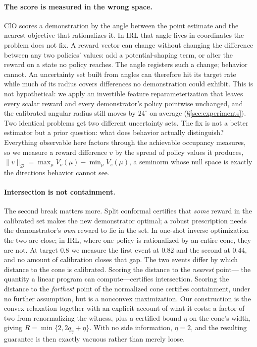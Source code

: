\documentclass{article}
\newcommand{\Dnorm}[1]{\|#1\|_{\mathcal D}}
\begin{document}
\paragraph{The score is measured in the wrong space.} CIO scores a
demonstration by the angle between the point estimate and the nearest objective
that rationalizes it. In IRL that angle lives in coordinates the problem does
not fix. A reward vector can change without changing the difference between any
two policies' values: add a potential-shaping term, or alter the reward on a
state no policy reaches. The angle registers such a change; behavior cannot. An
uncertainty set built from angles can therefore hit its target rate while
much of its radius covers differences no demonstration could exhibit. This is
not hypothetical:
we apply an invertible feature reparameterization that leaves every scalar
reward and every demonstrator's policy pointwise unchanged, and the calibrated
angular radius still moves by $24^\circ$ on average (\S\ref{sec:experiments}).
Two identical problems get two different uncertainty sets. The fix is not a
better estimator but a prior question: what does behavior actually distinguish?
Everything observable here factors through the achievable occupancy measures,
so we measure a reward difference $v$ by the spread of policy values it
produces, $\Dnorm{v}=\max_\mu
V_v(\mu)-\min_\mu V_v(\mu)$, a seminorm whose null space is exactly the
directions behavior cannot see.

\paragraph{Intersection is not containment.} The second break matters more.
Split conformal certifies that \emph{some} reward in the calibrated set makes the new
demonstrator optimal; a robust prescription needs the demonstrator's \emph{own}
reward to lie in the set. In one-shot inverse optimization the two are close;
in IRL, where one policy is rationalized by an entire cone, they are not. At
target $0.8$ we measure the first event at $0.82$ and the second at $0.44$, and
no amount of calibration closes that gap. The two events differ by which
distance to the cone is calibrated. Scoring the distance to the \emph{nearest} point---%
the quantity a linear program can compute---certifies intersection. Scoring the
distance to the \emph{farthest} point of the normalized cone certifies
containment, under no further assumption, but is a nonconvex maximization. Our
construction is the convex relaxation together with an explicit account of what
it costs: a factor of two from renormalizing the witness, plus a certified
bound $\eta$ on the cone's width, giving $R=\min\{2,2q_\gamma+\eta\}$. With no
side information, $\eta=2$, and the resulting guarantee is then exactly vacuous
rather than merely loose.
\end{document}
